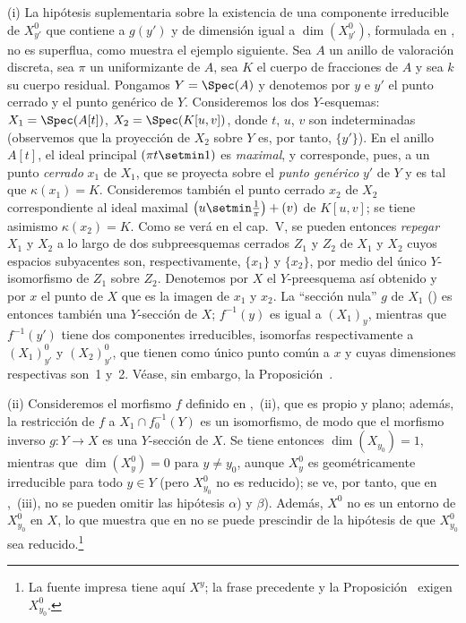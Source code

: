 \begin{remarks}[15.6.10]
\label{IV.15.6.10}
(i)
La hipótesis suplementaria sobre la existencia de una componente irreducible de $X_{y'}^0$ que contiene a $g(y')$ y de dimensión igual a $\dim(X_{y'}^0)$, formulada en , no es superflua, como muestra el ejemplo siguiente.
Sea $A$ un anillo de valoración discreta, sea $\pi$ un uniformizante de $A$, sea $K$ el cuerpo de fracciones de $A$ y sea $k$ su cuerpo residual. Pongamos $Y=\Spec(A)$ y denotemos por $y$ e $y'$ el punto cerrado y el punto genérico de $Y$.
Consideremos los dos $Y$-esquemas: $X_1=\Spec(A[t])$, $X_2=\Spec(K[u,v])$, donde $t$, $u$, $v$ son indeterminadas (observemos que la proyección de $X_2$ sobre $Y$ es, por tanto, $\{y'\}$).
En el anillo $A[t]$, el ideal principal $(\pi t\setmin 1)$ es \emph{maximal}, y corresponde, pues, a un punto \emph{cerrado} $x_1$ de $X_1$, que se proyecta sobre el \emph{punto genérico} $y'$ de $Y$ y es tal que $\kappa(x_1)=K$.
Consideremos también el punto cerrado $x_2$ de $X_2$ correspondiente al ideal maximal $\left(u\setmin\frac{1}{\pi}\right)+(v)$ de $K[u,v]$; se tiene asimismo $\kappa(x_2)=K$.
Como se verá en el cap.\ V, se pueden entonces \emph{repegar} $X_1$ y $X_2$ a lo largo de dos subpreesquemas cerrados $Z_1$ y $Z_2$ de $X_1$ y $X_2$ cuyos espacios subyacentes son, respectivamente, $\{x_1\}$ y $\{x_2\}$, por medio del único $Y$-isomorfismo de $Z_1$ sobre $Z_2$.
Denotemos por $X$ el $Y$-preesquema así obtenido y por $x$ el punto de $X$ que es la imagen de $x_1$ y $x_2$.
La ``sección nula'' $g$ de $X_1$ () es entonces también una $Y$-sección de $X$; $f^{-1}(y)$ es igual a $(X_1)_y$, mientras que $f^{-1}(y')$ tiene dos componentes irreducibles, isomorfas respectivamente a $(X_1)_{y'}^0$ y $(X_2)_{y'}^0$, que tienen como único punto común a $x$ y cuyas dimensiones respectivas son~1 y~2. Véase, sin embargo, la Proposición~.

(ii)
Consideremos el morfismo $f$ definido en ,~(ii), que es propio y plano; además, la restricción de $f$ a $X_1\cap f_0^{-1}(Y)$ es un isomorfismo, de modo que el morfismo inverso $g:Y\to X$ es una $Y$-sección de $X$.
Se tiene entonces $\dim(X_{y_0})=1$, mientras que $\dim(X_y^0)=0$ para $y\neq y_0$, aunque $X_y^0$ es geométricamente irreducible para todo $y\in Y$ (pero $X_{y_0}^0$ no es reducido); se ve, por tanto, que en ,~(iii), no se pueden omitir las hipótesis $\alpha$) y $\beta$).
Además, $X^0$ no es un entorno de $X_{y_0}^0$ en $X$, lo que muestra que en  no se puede prescindir de la hipótesis de que $X_{y_0}^0$ sea reducido.\footnote{La fuente impresa tiene aquí $X^y$; la frase precedente y la Proposición~ exigen $X_{y_0}^0$.}


\end{remarks}

